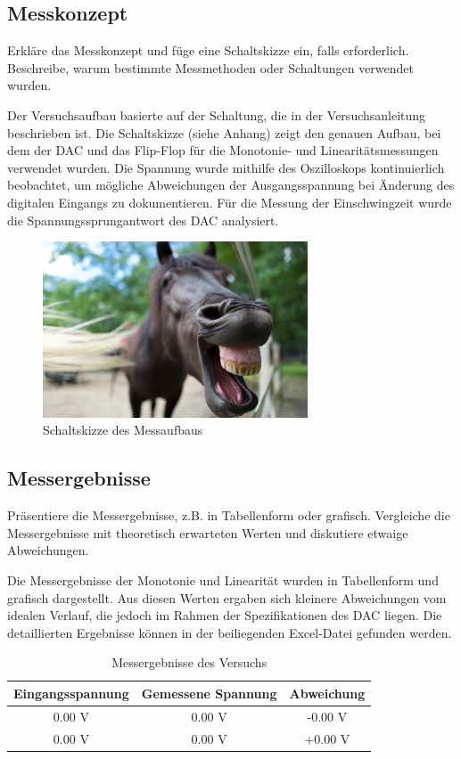 \documentclass[a4paper,12pt]{article}
\begin{document}
\subsection{Messkonzept}
Erkläre das Messkonzept und füge eine Schaltskizze ein, falls erforderlich. Beschreibe,
warum bestimmte Messmethoden oder Schaltungen verwendet wurden.

Der Versuchsaufbau basierte auf der Schaltung, die in der Versuchsanleitung beschrieben ist. Die Schaltskizze (siehe Anhang) zeigt den genauen Aufbau, bei dem der DAC und das Flip-Flop für die Monotonie- und Linearitätsmessungen verwendet wurden. Die Spannung wurde mithilfe des Oszilloskops kontinuierlich beobachtet, um mögliche Abweichungen der Ausgangsspannung bei Änderung des digitalen Eingangs zu dokumentieren. Für die Messung der Einschwingzeit wurde die Spannungssprungantwort des DAC analysiert.

\begin{figure}[H]
    \centering
    \includegraphics[width=0.7\textwidth]{Schaltskizze.jpg} %
    \caption{Schaltskizze des Messaufbaus}
\end{figure}

\subsection{Messergebnisse}
Präsentiere die Messergebnisse, z.B. in Tabellenform oder grafisch. Vergleiche die Messergebnisse mit theoretisch erwarteten Werten und diskutiere etwaige Abweichungen.

Die Messergebnisse der Monotonie und Linearität wurden in Tabellenform und grafisch dargestellt. Aus diesen Werten ergaben sich kleinere Abweichungen vom idealen Verlauf, die jedoch im Rahmen der Spezifikationen des DAC liegen. Die detaillierten Ergebnisse können in der beiliegenden Excel-Datei gefunden werden.

\begin{table}[H]
    \centering
    \begin{tabular}{|c|c|c|}
        \hline
        Eingangsspannung & Gemessene Spannung & Abweichung \\
        \hline
        0.00 V & 0.00 V & -0.00 V \\
        0.00 V & 0.00 V & +0.00 V \\
        \hline
    \end{tabular}
    \caption{Messergebnisse des Versuchs}
\end{table}
\end{document}
